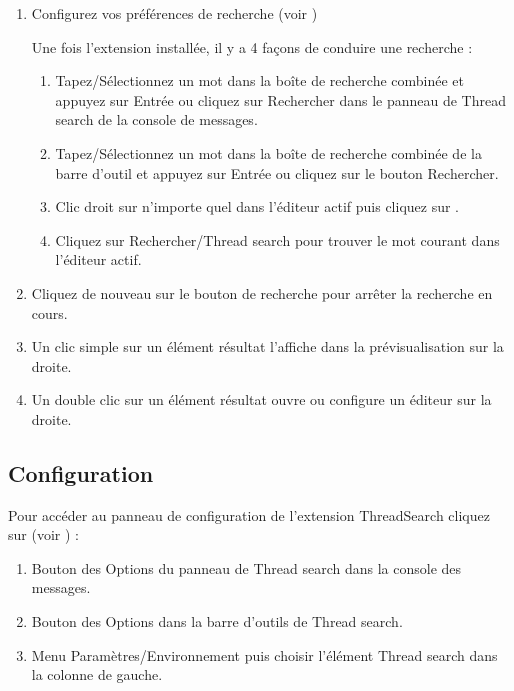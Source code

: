 \begin{enumerate}
\item Configurez vos préférences de recherche (voir )

Une fois l'extension installée, il y a 4 façons de conduire une recherche :

\begin{enumerate}
\item Tapez/Sélectionnez un mot dans la boîte de recherche combinée et appuyez sur Entrée ou cliquez sur Rechercher dans le panneau de Thread search de la console de messages.
\item Tapez/Sélectionnez un mot dans la boîte de recherche combinée de la barre d'outil et appuyez sur Entrée ou cliquez sur le bouton Rechercher.
\item Clic droit sur n'importe quel  dans l'éditeur actif puis cliquez sur .
\item Cliquez sur Rechercher/Thread search pour trouver le mot courant dans l'éditeur actif.
\end{enumerate}
\item Cliquez de nouveau sur le bouton de recherche pour arrêter la recherche en cours.
\item Un clic simple sur un élément résultat l'affiche dans la prévisualisation sur la droite.
\item Un double clic sur un élément résultat ouvre ou configure un éditeur sur la droite.
\end{enumerate}

\subsection{Configuration}

Pour accéder au panneau de configuration de l'extension ThreadSearch cliquez sur (voir ) :


\begin{enumerate}
\item Bouton des Options du panneau de Thread search dans la console des messages.
\item Bouton des Options dans la barre d'outils de Thread search.
\item Menu Paramètres/Environnement puis choisir l'élément Thread search dans la colonne de gauche.
\end{enumerate}

